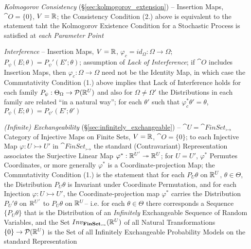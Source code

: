 \emph{Kolmogorov Consistency} (\S\ref{sec:kolmogorov_extension}) -- Insertion
Maps, $\cat{O} = \{ 0 \}$, $V = \mathbb{R}$; the Consistency Condition (2.) above
is equivalent to the statement taht the Kolmogorov Existence Condition for a
Stochastic Process is satisfied at \emph{each Parameter Point}

\emph{Interference} -- Insertion Maps, $V = \mathbb{R}$,
$\varphi_c = id_\Omega : \Omega \to \Omega$;
$P_\psi(E; \theta) = P_\psi'(E'; \theta)$;
assumption of \emph{Lack of Interference}; if $\cat{O}$ includes Insertion Maps,
then $\varphi_c : \Omega \to \Omega$ need not be the Identity Map, in which case
the Commutativity Condition (1.) above implies that Lack of Interference holds
for each family $P_\psi : \Theta_\Omega \to \mathcal{P}(\mathbb{R}^U)$ and also for
$\Omega \neq \Omega'$ the Distributions in each family are related ``in a
natural way''; for each $\theta'$ such that $\varphi_c^* \theta' = \theta$,
$P_\psi(E; \theta) = P_{\psi'}(E'; \theta')$

\emph{(Infinite) Exchangeability} (\S\ref{sec:infinitely_exchangeable}) --
$\cat{U} = \cat{FinSet}_\rightarrowtail$ Category of Injective Maps on Finite
Sets, $V = \mathbb{R}$, $\cat{O} = \{ 0 \}$; to each Injective Map
$\varphi : U \rightarrowtail U'$ in $\cat{FinSet}_\rightarrowtail$ the standard
(Contravariant) Representation associates the Surjective Linear Map
$\varphi^* : \mathbb{R}^{U'} \twoheadrightarrow \mathbb{R}^{U}$; for $U = U'$,
$\varphi^*$ Permutes Coordinates, or more generally $\varphi^*$ is a
Coordinate-projection Map; the Commutativity Condition (1.) is the statement
that for each $P_U\theta$ on $\mathbb{R}^U$, $\theta \in \Theta$, the Distribution
$P_U \theta$ is Invariant under Coordinate Permutation, and for each Injection
$\varphi : U \rightarrowtail U'$, the Coordinate-projection map $\varphi^*$
carries the Distribution $P_U'\theta$ on $\mathbb{R}^{U'}$ to $P_U\theta$ on
$\mathbb{R}^U$-- i.e. for each $\theta \in \Theta$ there corresponds a Sequence
$\{ P_U\theta \}$ that is the Distribution of an \emph{Infinitely} Exchangeable
Sequence of Random Variables, and the Set
$Inv_{\mathbf{FinSet}_\rightarrowtail}(\mathbb{R}^U)$ of all Natural Transformations
$\{0\} \to \mathcal{P}(\mathbb{R}^U)$ is the Set of all Infinitely Exchangeable
Probability Models on the standard Representation

